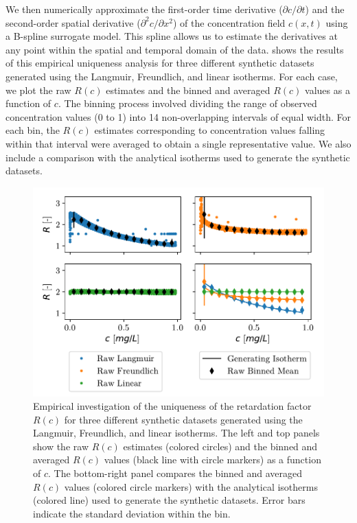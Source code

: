 We then numerically approximate the first-order time derivative ($\partial c / \partial t$) and the second-order spatial derivative ($\partial^2 c / \partial x^2$) of the concentration field $c(x,t)$ using a B-spline surrogate model. This spline allows us to estimate the derivatives at any point within the spatial and temporal domain of the data.
 shows the results of this empirical uniqueness analysis for three different synthetic datasets generated using the Langmuir, Freundlich, and linear isotherms. For each case, we plot the raw $R(c)$ estimates and the binned and averaged $R(c)$ values as a function of $c$. The binning process involved dividing the range of observed concentration values (0 to 1) into 14 non-overlapping intervals of equal width. For each bin, the $R(c)$ estimates corresponding to concentration values falling within that interval were averaged to obtain a single representative value. We also include a comparison with the analytical isotherms used to generate the synthetic datasets.

\begin{figure}[h!]
    \centering
    \includegraphics{figs/ret_uniqueness.pdf}
    \caption{Empirical investigation of the uniqueness of the retardation factor $R(c)$ for three different synthetic datasets generated using the Langmuir, Freundlich, and linear isotherms. The left and top panels show the raw $R(c)$ estimates (colored circles) and the binned and averaged $R(c)$ values (black line with circle markers) as a function of $c$. The bottom-right panel compares the binned and averaged $R(c)$ values (colored circle markers) with the analytical isotherms (colored line) used to generate the synthetic datasets. Error bars indicate the standard deviation within the bin.}
    \label{fig:ret_uniqueness}
\end{figure}


